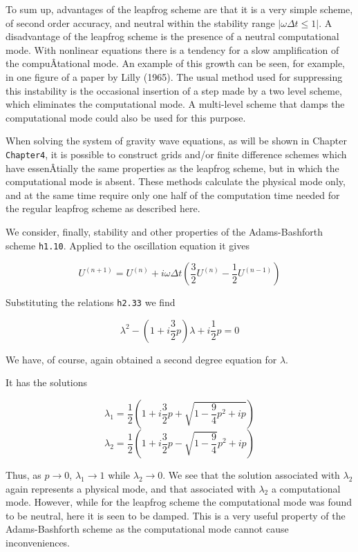 To sum up, advantages of the leapfrog scheme are that it is a very
simple scheme, of second order accuracy, and neutral within the
stability range \(\left| \omega\Delta t \leq 1 \right|\). A disadvantage
of the leapfrog scheme is the presence of a neutral computational mode.
With nonlinear equations there is a tendency for a slow amplification of
the compuÂ­tational mode. An example of this growth can be seen, for
example, in one figure of a paper by Lilly (1965). The usual method used
for suppressing this instability is the occasional insertion of a step
made by a two level scheme, which eliminates the computational mode. A
multi-level scheme that damps the computational mode could also be used
for this purpose.

When solving the system of gravity wave equations, as will be shown in
Chapter \texttt{Chapter4}, it is possible to construct grids and/or
finite difference schemes which have essenÂ­tially the same properties as
the leapfrog scheme, but in which the computational mode is absent.
These methods calculate the physical mode only, and at the same time
require only one half of the computation time needed for the regular
leapfrog scheme as described here.

We consider, finally, stability and other properties of the
Adams-Bashforth scheme \texttt{h1.10}. Applied to the oscillation
equation it gives

\[U^{( n + 1 )} = U^{(n)} + i\omega\Delta t \left( \frac{3}{2}U^{( n )} - \frac{1}{2}U^{\left( n - 1 \right)} \right)\]

Substituting the relations \texttt{h2.33} we find

\[\lambda^{2} - \left( 1 + i\frac{3}{2}p \right)\lambda + i\frac{1}{2}p = 0\]

We have, of course, again obtained a second degree equation for
\(\lambda\).

It has the solutions

\[\lambda_{1} = \frac{1}{2}\left( 1 + i\frac{3}{2}p + \sqrt{1 - \frac{9}{4}p^{2} + ip} \right)\]\[\lambda_{2} = \frac{1}{2}\left( 1 + i\frac{3}{2}p - \sqrt{1 - \frac{9}{4}}p^{2} + ip \right)\]

Thus, as \(p \rightarrow 0\), \(\lambda_{1} \rightarrow 1 \) while
\(\lambda_{2} \rightarrow 0\). We see that the solution associated with
\(\lambda_{2}\) again represents a physical mode, and that associated
with \(\lambda_{2}\) a computational mode. However, while for the
leapfrog scheme the computational mode was found to be neutral, here it
is seen to be damped. This is a very useful property of the
Adams-Bashforth scheme as the computational mode cannot cause
inconveniences.

